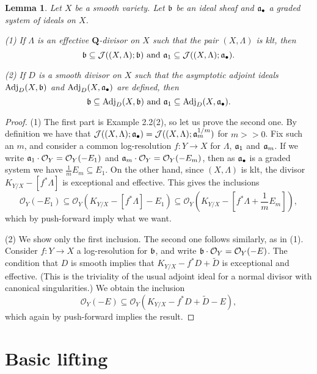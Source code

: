 \documentclass[11pt]{amsart}
\theoremstyle{plain}
\newtheorem{lemma}[theorem]{Lemma}
\theoremstyle{definition}
\newcommand{\QQ}{\mathbf{Q}}
\newcommand{\OO}{\mathcal  {O}}
\newcommand{\JJ}{\mathcal  {J}}
\newcommand{\fra}{\frak{a}}
\newcommand{\frb}{\frak{b}}
\newcommand{\Adj}{{\rm Adj}}
\begin{document}
\begin{lemma}\label{klt_inclusion}
Let $X$ be a smooth variety. Let $\frb$ be an ideal sheaf and $\fra_{\bullet}$ a graded system of ideals on $X$.
 
\noindent
(1) If $\Lambda$ is an effective $\QQ$-divisor on $X$ such that the pair $(X, \Lambda)$ is klt, then 
$$\frb \subseteq  \JJ ( (X, \Lambda); \frb) {\rm ~and~} \fra_1 \subseteq  \JJ ( (X, \Lambda); 
\fra_{\bullet} ).$$

\noindent 
(2) If $D$ is a smooth divisor on $X$ such that the asymptotic adjoint ideals 
$\Adj_D  (X, \frb)$ and $\Adj_D  (X, \fra_{\bullet})$ are defined, then 
$$\frb \subseteq \Adj_D  (X, \frb) {\rm~and~} \fra_1 \subseteq 
\Adj_D (X, \fra_{\bullet}).$$
\end{lemma}
\begin{proof}
(1) The first part is \cite{takayama} Example 2.2(2), so let us prove the second one. By definition we have that $ \JJ ( (X, \Lambda); \fra_{\bullet}) =  \JJ ( (X, \Lambda); \fra_m^{1/m})$ for $m>>0$.
Fix such an $m$, and consider a common log-resolution $f:Y \rightarrow X$ for $\Lambda$, $\fra_1$ and $\fra_m$. If we write $\fra_1\cdot \OO_Y = \OO_Y (- E_1)$ and $\fra_m \cdot \OO_Y= \OO_Y (- E_m)$, then as 
$\fra_{\bullet}$ is a graded system we have $\frac{1}{m} E_m \subseteq E_1$. On the other hand, since 
$(X, \Lambda)$ is klt, the divisor $K_{Y/X} - [f^*\Lambda]$ is exceptional and effective. This gives the inclusions 
$$\OO_Y(-E_1) \subseteq \OO_Y (K_{Y/X} - [f^*\Lambda] -  E_1) \subseteq 
\OO_Y (K_{Y/X} - [f^*\Lambda + \frac{1}{m} E_m]),$$
which by push-forward imply what we want.

\noindent
(2) We show only the first inclusion. The second one follows similarly, as in (1). Consider $f: Y \rightarrow X$ a log-resolution for $\frb$, and write $\frb\cdot \OO_Y = \OO_Y(-E)$. The condition that 
$D$ is smooth implies that $K_{Y/X} - f^*D + \tilde D$ is exceptional and effective. (This is the triviality
of the usual adjoint ideal for a normal divisor with canonical singularities.) We obtain the inclusion
$$\OO_Y(-E) \subseteq \OO_Y(K_{Y/X} - f^*D  + \tilde D - E),$$
which again by push-forward implies the result.
\end{proof}







\section{Basic lifting}
\end{document}
